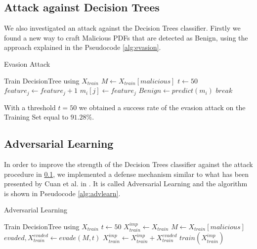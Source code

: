 \documentclass[twocolumn, switch]{article} %
\begin{document}
\subsection{Attack against Decision Trees}
\label{subsec:tree}
We also investigated an attack against the Decision Trees classifier. Firstly we found a new way to craft Malicious PDFs that are detected as Benign, using the approach explained in the Pseudocode \ref{alg:evasion}.
\begin{algorithm}
	{\footnotesize
		\caption{Evasion Attack}\label{alg:evasion}
		\begin{algorithmic}
			\Require Train DecisionTree using $X_{train}$
			\State $M \gets X_{train}[malicious]$
			\State $t \gets 50$
			\State $feature_j \gets feature_j + 1$
			\State $m_i[j] \gets feature_j$
			\State $Benign \gets predict(m_i)$
			\State $break$  
			\EndIf
			\EndWhile
			\EndFor
			\EndFor
		\end{algorithmic}
	}
\end{algorithm}

With a threshold $t=50$ we obtained a success rate of the evasion attack on the Training Set equal to $91.28\%$.

\subsection{Adversarial Learning}
In order to improve the strength of the Decision Trees classifier against the attack procedure in \ref{subsec:tree}, we implemented a defense mechanism similar to what has been presented by Cuan et al. in \cite{cuan_damien_delaplace_valois_2018}.
It is called Adversarial Learning and the algorithm is shown in Pseudocode \ref{alg:advlearn}.

\begin{algorithm}
	{\footnotesize
		\caption{Adversarial Learning}\label{alg:advlearn}
		\begin{algorithmic}
			\Require Train DecisionTree using $X_{train}$
			\State $t \gets 50$
			\State $X_{train}^{imp} \gets X_{train}$
			\State $M \gets X_{train}[malicious]$
			\While{$\#PDF evaded > 0$}
			\State $evaded,X_{train}^{evaded} \gets evade(M,t)$
			\If{$evaded$ is $True$}
			\State $X_{train}^{imp} \gets X_{train}^{imp} + X_{train}^{evaded}$
			\EndIf
			\State $train(X_{train}^{imp})$
			\EndWhile
		\end{algorithmic}
	}
\end{algorithm}
\end{document}
